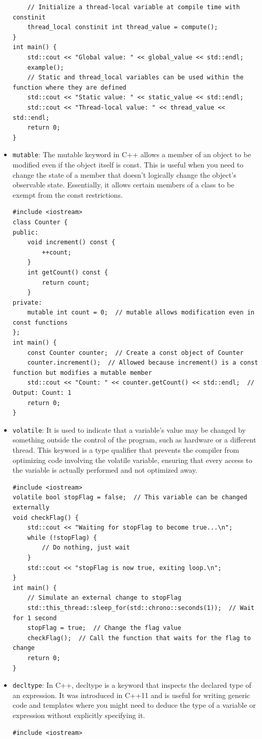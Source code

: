 \documentclass[12pt]{article}
\begin{document}
\begin{itemize}
\begin{lstlisting}
    // Initialize a thread-local variable at compile time with constinit
    thread_local constinit int thread_value = compute();
}
int main() {
    std::cout << "Global value: " << global_value << std::endl;
    example();
    // Static and thread_local variables can be used within the function where they are defined
    std::cout << "Static value: " << static_value << std::endl;
    std::cout << "Thread-local value: " << thread_value << std::endl;
    return 0;
}
    \end{lstlisting}
    \item \texttt{mutable}: The mutable keyword in C++ allows a member of an object to be modified even if the object itself is const. This is useful when you need to change the state of a member that doesn't logically change the object's observable state. Essentially, it allows certain members of a class to be exempt from the const restrictions.
    \begin{lstlisting}
#include <iostream>
class Counter {
public:
    void increment() const {
        ++count;
    }
    int getCount() const {
        return count;
    }
private:
    mutable int count = 0;  // mutable allows modification even in const functions
};
int main() {
    const Counter counter;  // Create a const object of Counter
    counter.increment();  // Allowed because increment() is a const function but modifies a mutable member
    std::cout << "Count: " << counter.getCount() << std::endl;  // Output: Count: 1
    return 0;
}
    \end{lstlisting}
    \item \texttt{volatile}: It is used to indicate that a variable's value may be changed by something outside the control of the program, such as hardware or a different thread. This keyword is a type qualifier that prevents the compiler from optimizing code involving the volatile variable, ensuring that every access to the variable is actually performed and not optimized away.
    \begin{lstlisting}
#include <iostream>
volatile bool stopFlag = false;  // This variable can be changed externally
void checkFlag() {
    std::cout << "Waiting for stopFlag to become true...\n";
    while (!stopFlag) {
        // Do nothing, just wait
    }
    std::cout << "stopFlag is now true, exiting loop.\n";
}
int main() {
    // Simulate an external change to stopFlag
    std::this_thread::sleep_for(std::chrono::seconds(1));  // Wait for 1 second
    stopFlag = true;  // Change the flag value
    checkFlag();  // Call the function that waits for the flag to change
    return 0;
}
    \end{lstlisting}
    \item \texttt{decltype}: In C++, decltype is a keyword that inspects the declared type of an expression. It was introduced in C++11 and is useful for writing generic code and templates where you might need to deduce the type of a variable or expression without explicitly specifying it.
    \begin{lstlisting}
#include <iostream>


\end{lstlisting}
\end{itemize}
\end{document}
